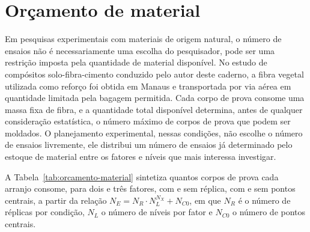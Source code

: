 \documentclass{doeapostila}
\begin{document}
\section{Orçamento de material}
\label{sec:orcamento}

Em pesquisas experimentais com materiais de origem natural, o número de
ensaios não é necessariamente uma escolha do pesquisador, pode ser uma
restrição imposta pela quantidade de material disponível. No estudo de
compósitos solo-fibra-cimento conduzido pelo autor deste caderno, a fibra
vegetal utilizada como reforço foi obtida em Manaus e transportada por via
aérea em quantidade limitada pela bagagem permitida. Cada corpo de prova
consome uma massa fixa de fibra, e a quantidade total disponível determina,
antes de qualquer consideração estatística, o número máximo de corpos de
prova que podem ser moldados. O planejamento experimental, nessas condições,
não escolhe o número de ensaios livremente, ele distribui um número de
ensaios já determinado pelo estoque de material entre os fatores e níveis
que mais interessa investigar.

A Tabela~\ref{tab:orcamento-material} sintetiza quantos corpos de prova cada
arranjo consome, para dois e três fatores, com e sem réplica, com e sem
pontos centrais, a partir da relação $N_{E} = N_{R} \cdot N_{L}^{N_X} +
N_{C0}$, em que $N_R$ é o número de réplicas por condição, $N_L$ o número de
níveis por fator e $N_{C0}$ o número de pontos centrais.
\end{document}
